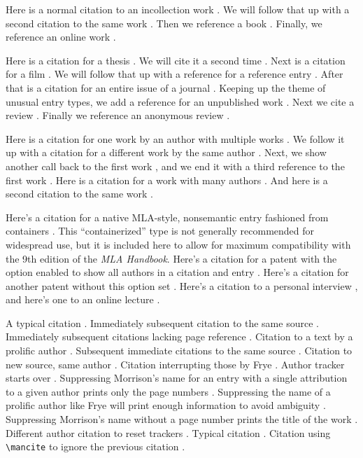 \documentclass{article}
\begin{document}
	
Here is a normal citation to an incollection work \autocite[7]{haggis99aa}. We will follow that up with a second citation to the same work \autocite[8]{haggis99aa}. Then we reference a book \autocite[194]{public08aa}. Finally, we reference an online work \autocite{Grammar-Girl2008}.

Here is a citation for a thesis \autocite[22]{webb84aa}. We will cite it a second time \autocite[23]{webb84aa}. Next is a citation for a film \autocite{jhabvala85aa}. We will follow that up with a reference for a reference entry \autocite{reference-noon89aa}. After that is a citation for an entire issue of a journal \autocite{appiah92aa}. Keeping up the theme of unusual entry types, we add a reference for an unpublished work \autocite{salviatiXXaa}. Next we cite a review \autocite[224]{slater01aa}. Finally we reference an anonymous review \autocite[785]{danish1972aa}.

Here is a citation for one work by an author with multiple works \autocite[12]{askme06aa}. We follow it up with a citation for a different work by the same author \autocite[34]{askme92aa}. Next, we show another call back to the first work \autocite[45]{askme06aa}, and we end it with a third reference to the first work \autocite[56]{askme06aa}. Here is a citation for a work with many authors \autocite[34]{Babich:2011dg}. And here is a second citation to the same work \autocite[32]{Babich:2011dg}.

Here's a citation for a native MLA-style, nonsemantic entry fashioned from containers \autocite{mla:shaw}. This ``containerized'' type is not generally recommended for widespread use, but it is included here to allow for maximum compatibility with the 9th edition of the \emph{MLA Handbook}. Here's a citation for a patent with the option enabled to show all authors in a citation and entry \autocite[12]{sorace}. Here's a citation for another patent without this option set \autocite[102]{laufenberg}. Here's a citation to a personal interview \autocite{misc:smith}, and here's one to an online lecture \autocite{elkm}.

A typical citation \autocite[12]{morrison02aa}. Immediately subsequent citation to the same source \autocite[34]{morrison02aa}. Immediately subsequent citations lacking page reference \autocite{morrison02aa}. Citation to a text by a prolific author \autocite[12]{frye57ab}. Subsequent immediate citations to the same source \autocite[34]{frye57ab}. Citation to new source, same author \autocite[56]{frye91aa}. Citation interrupting those by Frye \autocite[101]{morrison02aa}. Author tracker starts over \autocite[78]{frye91aa}. Suppressing Morrison's name for an entry with a single attribution to a given author prints only the page numbers \autocite*[102]{morrison02aa}. Suppressing the name of a prolific author like Frye will print enough information to avoid ambiguity \autocite*[91]{frye57ab}. Suppressing Morrison's name without a page number prints the title of the work \autocite*{morrison02aa}. Different author citation to reset trackers \autocite[91]{frye91aa}. Typical citation \autocite[12]{morrison02aa}. Citation using \verb|\mancite| to ignore the previous citation \mancite\autocite[34]{morrison02aa}.

\nocite{*}

\printbibliography
\end{document}
